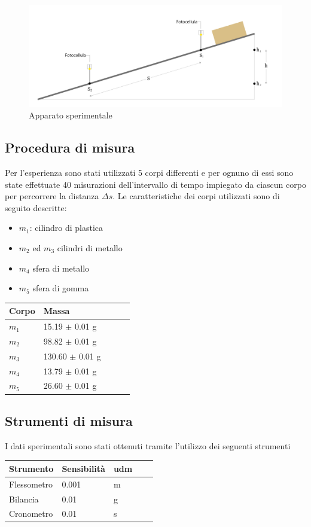 \documentclass[11pt,a4paper]{article}
\begin{document}
\begin{figure}[H]
\includegraphics[scale=0.18]{experimental-setup.png}
\centering
\caption{Apparato sperimentale}
\label{fig:appspe}
\end{figure}

\subsection{Procedura di misura}
Per l'esperienza sono stati utilizzati 5 corpi differenti e per ognuno di essi sono state effettuate 40 misurazioni dell'intervallo di tempo impiegato da ciascun corpo per percorrere la distanza $\Delta s$. Le caratteristiche dei corpi utilizzati sono di seguito descritte:
\begin{itemize}
    \item $m_1$: cilindro di plastica
    \item $m_2$ ed $m_3$ cilindri di metallo
    \item $m_4$ sfera di metallo
    \item $m_5$ sfera di gomma
\end{itemize}

\begin{longtable}[]{@{}lllll@{}}
\toprule
Corpo & Massa\tabularnewline
\midrule
\endhead
$m_1$    & 15.19 $\pm$ 0.01 g  \tabularnewline
$m_2$    & 98.82 $\pm$ 0.01 g  \tabularnewline
$m_3$    & 130.60 $\pm$ 0.01 g \tabularnewline
$m_4$    & 13.79 $\pm$ 0.01 g  \tabularnewline
$m_5$    & 26.60 $\pm$ 0.01 g  \tabularnewline
\bottomrule
\end{longtable}

\subsection{Strumenti di misura}
I dati sperimentali sono stati ottenuti tramite l'utilizzo dei seguenti strumenti

\begin{longtable}[]{@{}lllll@{}}
\toprule
Strumento & Sensibilità & udm \tabularnewline
\midrule
\endhead
Flessometro & 0.001 & m \tabularnewline
Bilancia & 0.01 & g \tabularnewline
Cronometro & 0.01 & s \tabularnewline
\bottomrule
\end{longtable}
\end{document}
